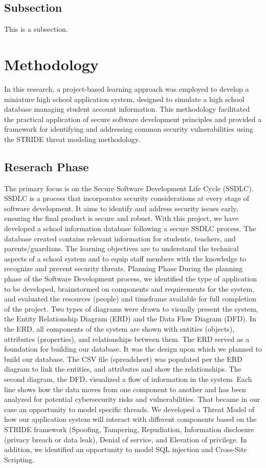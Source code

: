 \documentclass[letterpaper,twocolumn]{article}
\begin{document}
\subsection{Subsection} %
This is a subsection.

\section{Methodology}
In this research, a project-based learning approach was employed to develop a miniature high school application system, designed to simulate a high school database managing student account information. This methodology facilitated the practical application of secure software development principles and provided a framework for identifying and addressing common security vulnerabilities using the STRIDE threat modeling methodology.

\subsection{Reserach Phase}
The primary focus is on the Secure Software Development Life Cycle (SSDLC). SSDLC is a process that incorporates security considerations at every stage of software development. It aims to identify and address security issues early, ensuring the final product is secure and robust. With this project, we have developed a school information database following a secure SSDLC process. The database created contains relevant information for students, teachers, and parents/guardians. The learning objectives are to understand the technical aspects of a school system and to equip staff members with the knowledge to recognize and prevent security threats.
Planning Phase 
During the planning phase of the Software Development process, we identified the type of application to be developed, brainstormed on components and requirements for the system, and evaluated the resources (people) and timeframe available for full completion of the project. 
Two types of diagrams were drawn to visually present the system, the Entity Relationship Diagram (ERD) and the Data Flow Diagram (DFD). In the ERD, all components of the system are shown with entities (objects), attributes (properties), and relationships between them. The ERD served as a foundation for building our database. It was the design upon which we planned to build our database. The CSV file (spreadsheet) was populated per the ERD diagram to link the entities, and attributes and show the relationships. 
The second diagram, the DFD, visualized a flow of information in the system. Each line shows how the data moves from one component to another and has been analyzed for potential cybersecurity risks and vulnerabilities. That became in our case an opportunity to model specific threads.  We developed a Threat Model of how our application system will interact with different components based on the STRIDE framework (Spoofing, Tampering, Repudiation, Information disclosure (privacy breach or data leak), Denial of service, and Elevation of privilege. In addition, we identified an opportunity to model SQL injection and Cross-Site Scripting.
\end{document}
